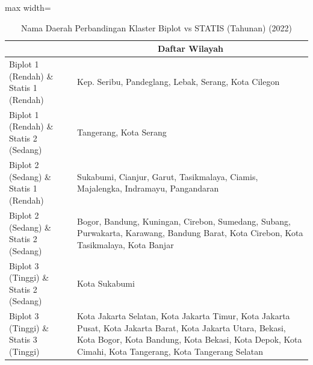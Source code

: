 \begin{table}[H]
\centering
\caption{Nama Daerah Perbandingan Klaster Biplot vs STATIS (Tahunan) (2022)} \label{tab:app1biplot_statis_comp_name_2022}
\begin{adjustbox}{max width=\textwidth}
\begin{tabular}{|>{\centering\arraybackslash}p{4cm}|p{10cm}|}
\hline
\multicolumn{1}{|c|}{\textbf{Kategori}} & \multicolumn{1}{c|}{\textbf{Daftar Wilayah}} \\
\hline
Biplot 1 (Rendah) \& Statis 1 (Rendah) & Kep. Seribu, Pandeglang, Lebak, Serang, Kota Cilegon \\
\hline
Biplot 1 (Rendah) \& Statis 2 (Sedang) & Tangerang, Kota Serang \\
\hline
Biplot 2 (Sedang) \& Statis 1 (Rendah) & Sukabumi, Cianjur, Garut, Tasikmalaya, Ciamis, Majalengka, Indramayu, Pangandaran \\
\hline
Biplot 2 (Sedang) \& Statis 2 (Sedang) & Bogor, Bandung, Kuningan, Cirebon, Sumedang, Subang, Purwakarta, Karawang, Bandung Barat, Kota Cirebon, Kota Tasikmalaya, Kota Banjar \\
\hline
Biplot 3 (Tinggi) \& Statis 2 (Sedang) & Kota Sukabumi \\
\hline
Biplot 3 (Tinggi) \& Statis 3 (Tinggi) & Kota Jakarta Selatan, Kota Jakarta Timur, Kota Jakarta Pusat, Kota Jakarta Barat, Kota Jakarta Utara, Bekasi, Kota Bogor, Kota Bandung, Kota Bekasi, Kota Depok, Kota Cimahi, Kota Tangerang, Kota Tangerang Selatan \\
\hline
\end{tabular}
\end{adjustbox}
\end{table}